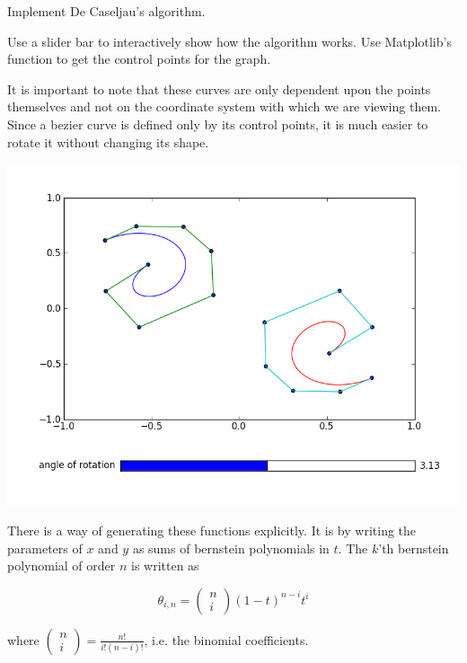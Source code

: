 \begin{problem}
Implement De Caseljau's algorithm.
\end{problem}

\begin{problem}
Use a slider bar to interactively show how the algorithm works. Use Matplotlib's  function to get the control points for the graph.
\end{problem}

It is important to note that these curves are only dependent upon the points themselves and not on the coordinate system with which we are viewing them. Since a bezier curve is defined only by its control points, it is much easier to rotate it without changing its shape.

\includegraphics[width=\textwidth]{bezier_rotation}

There is a way of generating these functions explicitly. It is by writing the parameters of $x$ and $y$ as sums of bernstein polynomials in $t$. The $k$'th bernstein polynomial of order $n$ is written as 

$$\theta_{i,n}=\left( \begin{smallmatrix} n\\ i \end{smallmatrix} \right) (1-t)^{n-i} t^i$$

where $\left( \begin{smallmatrix} n\\ i \end{smallmatrix} \right) = \frac{n!}{i!(n-i)!}$, i.e. the binomial coefficients.


